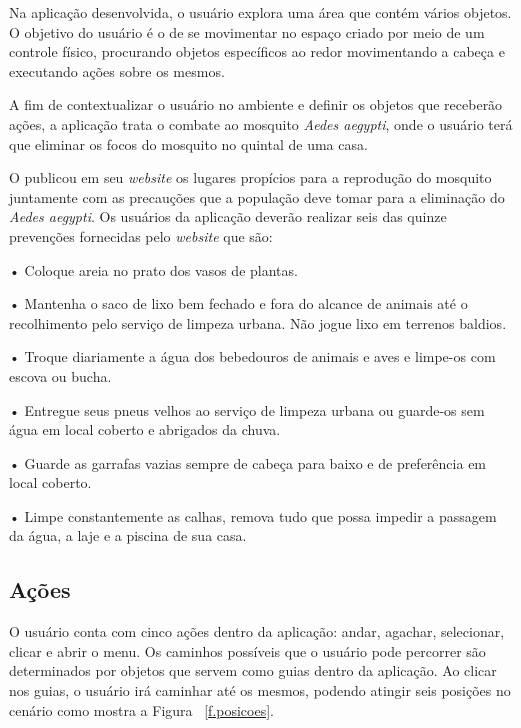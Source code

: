 Na aplicação desenvolvida, o usuário explora uma área que contém vários objetos. O objetivo do usuário é o de se movimentar no espaço criado por meio de um controle físico, procurando objetos específicos ao redor movimentando a cabeça e executando ações sobre os mesmos.

A fim de contextualizar o usuário no ambiente e definir os objetos que receberão ações, a aplicação trata o combate ao mosquito \textit{Aedes aegypti}, onde o usuário terá que eliminar os focos do mosquito no quintal de uma casa. 

O  publicou em seu \textit{website} os lugares propícios para a reprodução do mosquito juntamente com as precauções que a população deve tomar para a eliminação do \textit{Aedes aegypti}. Os usuários da aplicação deverão realizar seis das quinze prevenções fornecidas pelo \textit{website} que são:

•	Coloque areia no prato dos vasos de plantas.

•	Mantenha o saco de lixo bem fechado e fora do alcance de animais até o recolhimento pelo serviço de limpeza urbana. Não jogue lixo em terrenos baldios.

•	Troque diariamente a água dos bebedouros de animais e aves e limpe-os com escova ou bucha.

•	Entregue seus pneus velhos ao serviço de limpeza urbana ou guarde-os sem água em local coberto e abrigados da chuva.

•	Guarde as garrafas vazias sempre de cabeça para baixo e de preferência em local coberto.

•	Limpe constantemente as calhas, remova tudo que possa impedir a passagem da água, a laje e a piscina de sua casa.

\subsection{Ações}
\label{ss.acoes}

O usuário conta com cinco ações dentro da aplicação: andar, agachar, selecionar, clicar e abrir o menu. Os caminhos possíveis que o usuário pode percorrer são determinados por objetos que servem como guias dentro da aplicação. Ao clicar nos guias, o usuário irá caminhar até os mesmos, podendo atingir seis posições no cenário como mostra a Figura ~\ref{f.posicoes}.

